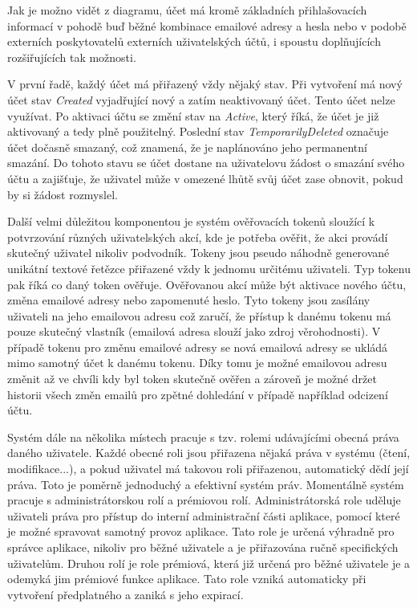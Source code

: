 \begin{itemize}
\begin{itemize}
		Jak je možno vidět z diagramu, účet má kromě základních přihlašovacích informací v pohodě buď běžné kombinace emailové adresy
		a hesla nebo v podobě externích poskytovatelů externích uživatelských účtů, i spoustu
		doplňujících rozšiřujících tak možnosti.

		V první řadě, každý účet má přiřazený vždy nějaký stav.
		Při vytvoření má nový účet stav \emph{Created} vyjadřující nový a zatím neaktivovaný účet.
		Tento účet nelze využívat.
		Po aktivaci účtu se změní stav na \emph{Active}, který říká, že účet je již aktivovaný a tedy plně použitelný.
		Poslední stav \emph{TemporarilyDeleted} označuje účet dočasně smazaný, což znamená, že je naplánováno jeho permanentní
		smazání.
		Do tohoto stavu se účet dostane na uživatelovu žádost o smazání svého účtu a zajišťuje, že uživatel může v omezené
		lhůtě svůj účet zase obnovit, pokud by si žádost rozmyslel.

		Další velmi důležitou komponentou je systém ověřovacích tokenů sloužící k potvrzování různých uživatelských akcí, kde
		je potřeba ověřit, že akci provádí skutečný uživatel nikoliv podvodník.
		Tokeny jsou pseudo náhodně generované unikátní textové řetězce přiřazené vždy k jednomu určitému uživateli.
		Typ tokenu pak říká co daný token ověřuje.
		Ověřovanou akcí může být aktivace nového účtu, změna emailové adresy nebo zapomenuté heslo.
		Tyto tokeny jsou zasílány uživateli na jeho emailovou adresu což zaručí, že přístup k danému tokenu má pouze skutečný
		vlastník (emailová adresa slouží jako zdroj věrohodnosti).
		V případě tokenu pro změnu emailové adresy se nová emailová adresy se ukládá mimo samotný účet k danému tokenu.
		Díky tomu je možné emailovou adresu změnit až ve chvíli kdy byl token skutečně ověřen a zároveň je možné držet
		historii všech změn emailů pro zpětné dohledání v případě například odcizení účtu.

		Systém dále na několika místech pracuje s tzv. rolemi udávajícími obecná práva daného uživatele.
		Každé obecné roli jsou přiřazena nějaká práva v systému (čtení, modifikace...), a pokud uživatel má takovou roli
		přiřazenou, automatický dědí její práva.
		Toto je poměrně jednoduchý a efektivní systém práv.
		Momentálně systém pracuje s administrátorskou rolí a prémiovou rolí.
		Administrátorská role uděluje uživateli práva pro přístup do interní administrační části
		aplikace, pomocí které je možné spravovat samotný provoz aplikace.
		Tato role je určená výhradně pro správce aplikace, nikoliv pro běžné uživatele a je přiřazována ručně specifických
		uživatelům.
		Druhou rolí je role prémiová, která již určená pro běžné uživatele je a odemyká jim prémiové funkce aplikace.
		Tato role vzniká automaticky při vytvoření předplatného a zaniká s jeho expirací.


\end{itemize}
\end{itemize}
